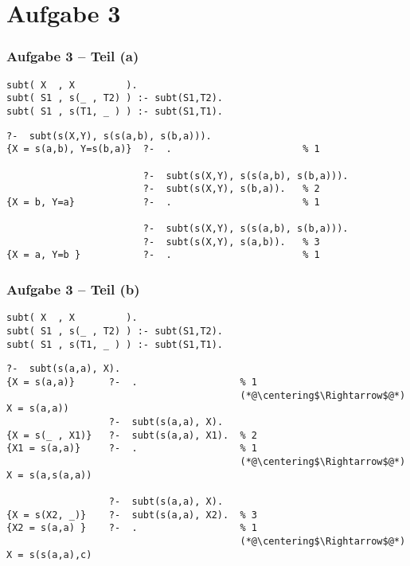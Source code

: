 \documentclass{beamer}
\begin{document}


\section{Aufgabe 3}

\begin{frame}[fragile] \frametitle{Aufgabe 3 -- Teil (a)}
	\begin{lstlisting}
subt( X  , X         ). 
subt( S1 , s(_ , T2) ) :- subt(S1,T2).
subt( S1 , s(T1, _ ) ) :- subt(S1,T1).
	\end{lstlisting}
	
	
	\begin{lstlisting}[style=refutation, basicstyle=\ttfamily\scriptsize]
                        ?-  subt(s(X,Y), s(s(a,b), s(b,a))). 
{X = s(a,b), Y=s(b,a)}  ?-  .                       % 1  

                        ?-  subt(s(X,Y), s(s(a,b), s(b,a))).
                        ?-  subt(s(X,Y), s(b,a)).   % 2
{X = b, Y=a}            ?-  .                       % 1

                        ?-  subt(s(X,Y), s(s(a,b), s(b,a))).
                        ?-  subt(s(X,Y), s(a,b)).   % 3
{X = a, Y=b }           ?-  .                       % 1
	\end{lstlisting}
\end{frame}

\begin{frame}[fragile] \frametitle{Aufgabe 3 -- Teil (b)}
	\begin{lstlisting}
subt( X  , X         ). 
subt( S1 , s(_ , T2) ) :- subt(S1,T2).
subt( S1 , s(T1, _ ) ) :- subt(S1,T1).
	\end{lstlisting}


\begin{lstlisting}[style=refutation, basicstyle=\ttfamily\scriptsize]
                  ?-  subt(s(a,a), X). 
{X = s(a,a)}      ?-  .                  % 1
                                         (*@\centering$\Rightarrow$@*) X = s(a,a))
                  ?-  subt(s(a,a), X). 
{X = s(_ , X1)}   ?-  subt(s(a,a), X1).  % 2 
{X1 = s(a,a)}     ?-  .                  % 1 
                                         (*@\centering$\Rightarrow$@*) X = s(a,s(a,a))

                  ?-  subt(s(a,a), X). 
{X = s(X2, _)}    ?-  subt(s(a,a), X2).  % 3 
{X2 = s(a,a) }    ?-  .                  % 1 
                                         (*@\centering$\Rightarrow$@*) X = s(s(a,a),c)
\end{lstlisting}
\end{frame}
\end{document}
